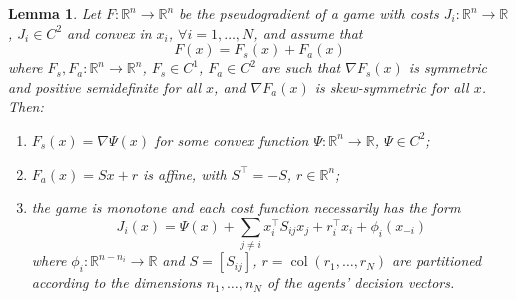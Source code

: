 \documentclass[11pt, a4paper]{article}
\newcommand{\rr}{\mathbb{R}}
\newtheorem{lemma}[theorem]{Lemma}
\theoremstyle{remark}
\theoremstyle{plain}
\begin{document}
\begin{lemma}
\label{lem:splitting}
Let $F:\rr^n\to\rr^n$ be the pseudogradient of a game with
costs $J_i:\rr^n\to\rr$, $J_i\in C^2$ and convex in $x_i$, $\forall i=1,\ldots,N$,
and assume that
\begin{equation}
F(x)=F_s(x)+F_a(x)
\label{eq:F(x)-split}
\end{equation}
where $F_s,F_a:\rr^n\to\rr^n$, $F_s\in C^1$, $F_a\in C^2$ are such that
$\nabla F_s(x)$ is symmetric and positive semidefinite for all $x$, and
$\nabla F_a(x)$ is skew-symmetric for all $x$. Then:
\begin{enumerate}
\item[($i$)] $F_s(x)=\nabla\Psi(x)$ for some convex function
$\Psi:\rr^n\to\rr$, $\Psi\in C^2$;
\item[($ii$)] $F_a(x)=Sx+r$ is affine, with $S^\top=-S$,
$r\in\rr^n$;
\item[($iii$)] the game is monotone and each cost function necessarily has
the form
\begin{equation}
J_i(x)=\Psi(x)+\sum_{j\neq i}x_i^\top S_{ij}x_j+r_i^\top x_i
+\phi_i(x_{-i})
\label{eq:J_i-form}
\end{equation}
where $\phi_i:\rr^{n-n_i}\to\rr$ and
$S=[S_{ij}]$, $r=\operatorname{col}(r_1,\ldots,r_N)$ are partitioned
according to the dimensions $n_1,\ldots,n_N$ of the agents' decision vectors.
\end{enumerate}
\end{lemma}
\end{document}

